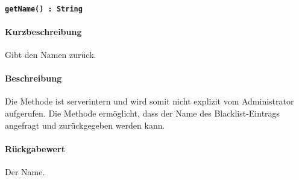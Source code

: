 \paragraph{\texttt{getName() : String}}%
\paragraph*{Kurzbeschreibung}
Gibt den Namen zurück.
\paragraph*{Beschreibung}
Die Methode ist serverintern und wird somit nicht explizit vom Administrator aufgerufen.
Die Methode ermöglicht, dass der Name des Blacklist-Eintrags angefragt und zurückgegeben werden kann.
\paragraph*{Rückgabewert}
Der Name.
